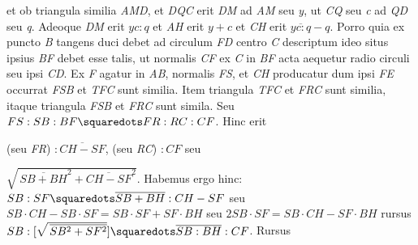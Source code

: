 et ob triangula similia \textit{AMD}, et \textit{DQC} erit \textit{DM} ad \textit{AM} seu \textit{y}, ut \textit{CQ} seu \textit{c} ad \textit{QD} seu \textit{q}. Adeoque \textit{DM} erit $yc:q$ et \textit{AH} erit $y+c$ et \textit{CH} erit $\overline{yc:q}-q$. Porro quia ex puncto \textit{B} tangens
duci debet ad circulum \textit{FD} centro \textit{C} descriptum ideo situs ipsius \textit{BF} debet esse talis, ut normalis \textit{CF} ex \textit{C} in \textit{BF} acta aequetur radio circuli seu ipsi \textit{CD}. Ex \textit{F} agatur in \textit{AB}, normalis \textit{FS},
et \textit{CH} producatur dum ipsi \textit{FE} occurrat
\textit{FSB} et \textit{TFC} sunt similia.
Item triangula \textit{TFC} et \textit{FRC} sunt similia, itaque triangula \textit{FSB} et \textit{FRC} sunt simila. Seu $FS:SB:BF\squaredots FR:RC:CF$. %
\pend
\pstart
Hinc erit 
\rule[0ex]{0pt}{4ex}%
(seu \textit{FR}) $:\overline{CH-SF}$, (seu \textit{RC}) $:CF$ seu 
%
%
\rule[-.5ex]{0pt}{4ex}%
$\sqrt{\,\overline{SB+BH}^2+\overline{CH-SF}^2}$. Habemus ergo hinc: $SB:SF\squaredots \overline{SB+BH}:CH-SF$ seu 
$SB\cdot CH-SB\cdot SF=SB\cdot SF+SF\cdot BH$ seu $2SB\cdot SF=SB\cdot CH-SF\cdot BH$ rursus $SB:\bracks{\sqrt{\,\overline{SB^2+SF^2}}} \squaredots \overline{SB:BH}:CF$. Rursus%
